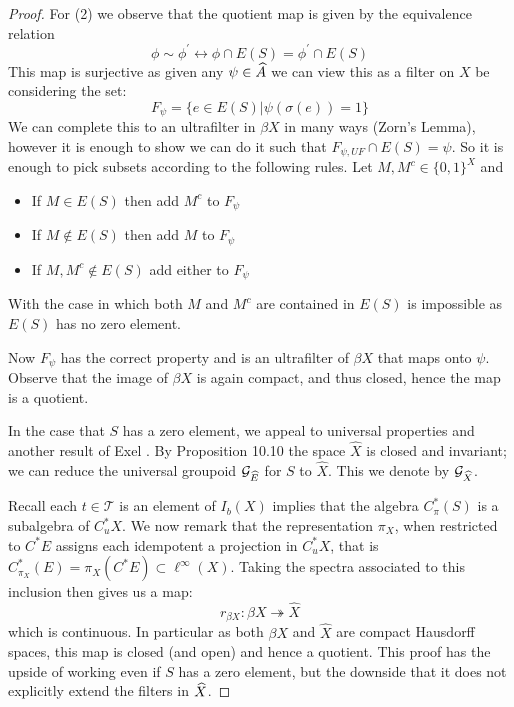 \begin{corollary}
\begin{proof}
For (2) we observe that the quotient map is given by the equivalence relation 
\begin{equation*}
\phi \sim \phi^{'} \leftrightarrow \phi \cap E(S) = \phi^{'} \cap E(S)
\end{equation*}
This map is surjective as given any $\psi \in \widehat{A}$ we can view this as a filter on $X$ be considering the set:
\begin{equation*}
F_{\psi} = \lbrace e \in E(S) | \psi(\sigma(e))=1 \rbrace
\end{equation*}
We can complete this to an ultrafilter in $\beta X$ in many ways (Zorn's Lemma), however it is enough to show we can do it such that $F_{\psi ,UF}\cap E(S) = \psi$. So it is enough to pick subsets according to the following rules. Let $M,M^{c} \in \lbrace 0,1 \rbrace^{X}$ and
\begin{itemize}
\item If $M \in E(S)$ then add $M^{c}$ to $F_{\psi}$
\item If $M \not\in E(S)$ then add $M$ to $F_{\psi}$
\item If $M,M^{c} \not \in E(S)$ add either to $F_{\psi}$
\end{itemize}
With the case in which both $M$ and $M^{c}$ are contained in $E(S)$ is impossible as $E(S)$ has no zero element.

Now $F_{\psi}$ has the correct property and is an ultrafilter of $\beta X$ that maps onto $\psi$. Observe that the image of $\beta X$ is again compact, and thus closed, hence the map is a quotient.

In the case that $S$ has a zero element, we appeal to universal properties and another result of Exel \cite{MR2419901}. By Proposition 10.10 \cite{MR2419901} the space $\widehat{X}$ is closed and invariant; we can reduce the universal groupoid $\mathcal{G}_{\widehat{E}}$ for $S$ to $\widehat{X}$. This we denote by $\mathcal{G}_{\widehat{X}}$. 

Recall each $t \in \mathcal{T}$ is an element of $I_{b}(X)$ implies that the algebra $C^{*}_{\pi}(S)$ is a subalgebra of $C^{*}_{u}X$. We now remark that the representation $\pi_{X}$, when restricted to $C^{*}E$ assigns each idempotent a projection in $C^{*}_{u}X$, that is $C^{*}_{\pi_{X}}(E)=\pi_{X}(C^{*}E) \subset \ell^{\infty}(X)$. Taking the spectra associated to this inclusion then gives us a map:
\begin{equation*}
r_{\beta X}: \beta X \twoheadrightarrow \widehat{X}
\end{equation*}
which is continuous. In particular as both $\beta X$ and $\widehat{X}$ are compact Hausdorff spaces, this map is closed (and open) and hence a quotient. This proof has the upside of working even if $S$ has a zero element, but the downside that it does not explicitly extend the filters in $\widehat{X}$.
\end{proof}


\end{corollary}
